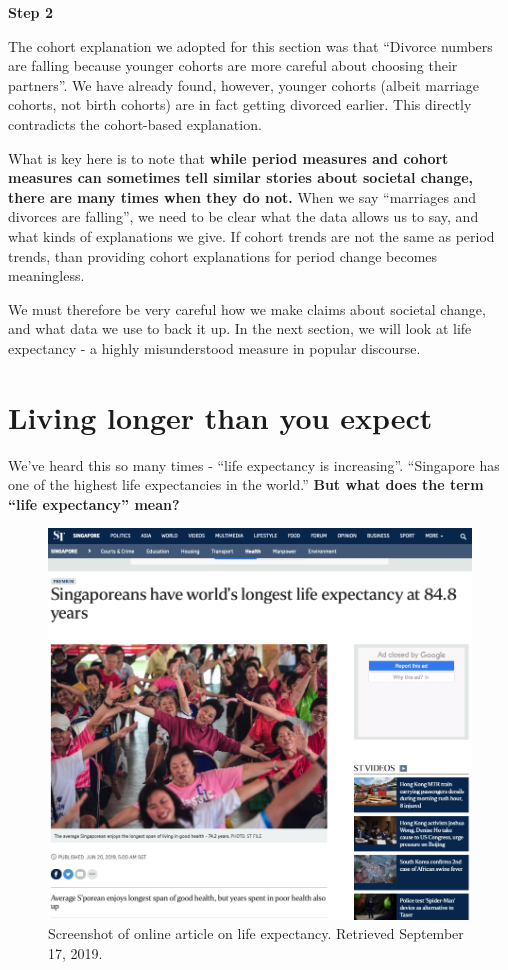 \documentclass[
  openany]{book}
\begin{document}
\textbf{Step 2}

The cohort explanation we adopted for this section was that ``Divorce numbers are falling because younger cohorts are more careful about choosing their partners''. We have already found, however, younger cohorts (albeit marriage cohorts, not birth cohorts) are in fact getting divorced earlier. This directly contradicts the cohort-based explanation.

What is key here is to note that \textbf{while period measures and cohort measures can sometimes tell similar stories about societal change, there are many times when they do not.} When we say ``marriages and divorces are falling'', we need to be clear what the data allows us to say, and what kinds of explanations we give. If cohort trends are not the same as period trends, than providing cohort explanations for period change becomes meaningless.

We must therefore be very careful how we make claims about societal change, and what data we use to back it up. In the next section, we will look at life expectancy - a highly misunderstood measure in popular discourse.

\hypertarget{living-longer-than-you-expect}{%
\section{Living longer than you expect}\label{living-longer-than-you-expect}}

We've heard this so many times - ``life expectancy is increasing''. ``Singapore has one of the highest life expectancies in the world.'' \textbf{But what does the term ``life expectancy'' mean?}

\begin{figure}

{\centering \includegraphics[width=0.8\linewidth]{images/apc/apc_lifeexpectancy} 

}

\caption{Screenshot of online article on life expectancy. Retrieved September 17, 2019.}\label{fig:apc-lifeexp}
\end{figure}
\end{document}

